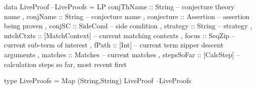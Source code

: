 \newpage
\begin{code}
data LiveProof                                                    --LiveProofs
  = LP {
      conjThName :: String -- conjecture theory name
    , conjName :: String -- conjecture name
    , conjecture :: Assertion -- assertion being proven
    , conjSC :: SideCond -- side condition
    , strategy :: String -- strategy
    , mtchCtxts :: [MatchContext] -- current matching contexts
    , focus :: SeqZip  -- current sub-term of interest
    , fPath :: [Int] -- current term zipper descent arguments
    , matches :: Matches -- current matches
    , stepsSoFar :: [CalcStep]  -- calculation steps so far, most recent first
    }
\end{code}

\begin{code}
type LiveProofs = Map (String,String) LiveProof                   --LiveProofs
\end{code}
